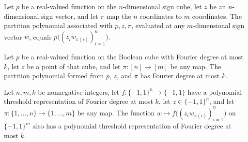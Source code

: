 \begin{theorem}
\label{FABL.partitionPolynomial_apply}
\leanok
{}
Let $p$ be a real-valued function on the $n$-dimensional sign cube, let $z$ be an
$n$-dimensional sign vector, and let $\pi$ map the $n$ coordinates to $m$ coordinates.
The partition polynomial associated with $p,z,\pi$, evaluated at any $m$-dimensional
sign vector $w$, equals $p\bigl((z_iw_{\pi(i)})_{i=1}^n\bigr)$.
\end{theorem}

\begin{theorem}
\label{FABL.fourierDegree_partitionPolynomial_le}
\leanok
{}
Let $p$ be a real-valued function on the Boolean cube with Fourier degree at most $k$,
let $z$ be a point of that cube, and let $\pi:[n]\to[m]$ be any map. The partition
polynomial formed from $p$, $z$, and $\pi$ has Fourier degree at most $k$.
\end{theorem}

\begin{theorem}
\label{FABL.isPolynomialThreshold_partitionFunction}
\leanok
{}
Let $n,m,k$ be nonnegative integers, let $f:\{-1,1\}^n\to\{-1,1\}$ have a polynomial
threshold representation of Fourier degree at most $k$, let $z\in\{-1,1\}^n$, and let
$\pi:\{1,\ldots,n\}\to\{1,\ldots,m\}$ be any map. The function $w\mapsto
f\bigl((z_iw_{\pi(i)})_{i=1}^n\bigr)$ on $\{-1,1\}^m$ also has a polynomial threshold
representation of Fourier degree at most $k$.
\end{theorem}

